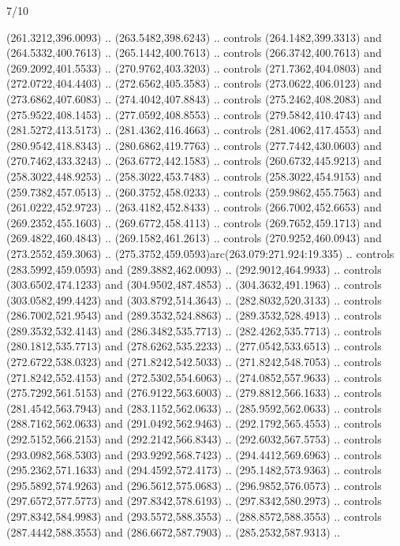 \begin{flagdescription}{7/10}
\begin{scope}[xshift=0.5\flaglength]
\begin{scope}[scale=0.00185\flagwidth,yshift=245mm,xshift=-43.7mm]
\begin{scope}[y=-0.8pt, x=0.8pt, inner sep=0pt, outer sep=0pt]
  (261.3212,396.0093) .. (263.5482,398.6243) .. controls (264.1482,399.3313) and
  (264.5332,400.7613) .. (265.1442,400.7613) .. controls (266.3742,400.7613) and
  (269.2092,401.5533) .. (270.9762,403.3203) .. controls (271.7362,404.0803) and
  (272.0722,404.4403) .. (272.6562,405.3583) .. controls (273.0622,406.0123) and
  (273.6862,407.6083) .. (274.4042,407.8843) .. controls (275.2462,408.2083) and
  (275.9522,408.1453) .. (277.0592,408.8553) .. controls (279.5842,410.4743) and
  (281.5272,413.5173) .. (281.4362,416.4663) .. controls (281.4062,417.4553) and
  (280.9542,418.8343) .. (280.6862,419.7763) .. controls (277.7442,430.0603) and
  (270.7462,433.3243) .. (263.6772,442.1583) .. controls (260.6732,445.9213) and
  (258.3022,448.9253) .. (258.3022,453.7483) .. controls (258.3022,454.9153) and
  (259.7382,457.0513) .. (260.3752,458.0233) .. controls (259.9862,455.7563) and
  (261.0222,452.9723) .. (263.4182,452.8433) .. controls (266.7002,452.6653) and
  (269.2352,455.1603) .. (269.6772,458.4113) .. controls (269.7652,459.1713) and
  (269.4822,460.4843) .. (269.1582,461.2613) .. controls (270.9252,460.0943) and
  (273.2552,459.3063) .. (275.3752,459.0593)arc(263.079:271.924:19.335) ..
  controls (283.5992,459.0593) and (289.3882,462.0093) .. (292.9012,464.9933) ..
  controls (303.6502,474.1233) and (304.9502,487.4853) .. (304.3632,491.1963) ..
  controls (303.0582,499.4423) and (303.8792,514.3643) .. (282.8032,520.3133) ..
  controls (286.7002,521.9543) and (289.3532,524.8863) .. (289.3532,528.4913) ..
  controls (289.3532,532.4143) and (286.3482,535.7713) .. (282.4262,535.7713) ..
  controls (280.1812,535.7713) and (278.6262,535.2233) .. (277.0542,533.6513) ..
  controls (272.6722,538.0323) and (271.8242,542.5033) .. (271.8242,548.7053) ..
  controls (271.8242,552.4153) and (272.5302,554.6063) .. (274.0852,557.9633) ..
  controls (275.7292,561.5153) and (276.9122,563.6003) .. (279.8812,566.1633) ..
  controls (281.4542,563.7943) and (283.1152,562.0633) .. (285.9592,562.0633) ..
  controls (288.7162,562.0633) and (291.0492,562.9463) .. (292.1792,565.4553) ..
  controls (292.5152,566.2153) and (292.2142,566.8343) .. (292.6032,567.5753) ..
  controls (293.0982,568.5303) and (293.9292,568.7423) .. (294.4412,569.6963) ..
  controls (295.2362,571.1633) and (294.4592,572.4173) .. (295.1482,573.9363) ..
  controls (295.5892,574.9263) and (296.5612,575.0683) .. (296.9852,576.0573) ..
  controls (297.6572,577.5773) and (297.8342,578.6193) .. (297.8342,580.2973) ..
  controls (297.8342,584.9983) and (293.5572,588.3553) .. (288.8572,588.3553) ..
  controls (287.4442,588.3553) and (286.6672,587.7903) .. (285.2532,587.9313) ..

\end{scope}
\end{scope}
\end{scope}
\end{flagdescription}
